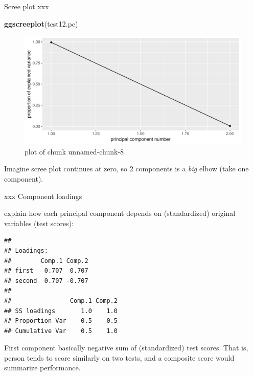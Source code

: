 \documentclass[ignorenonframetext,]{beamer}
\newenvironment{Shaded}{\begin{snugshade}}{\end{snugshade}}
\newcommand{\KeywordTok}[1]{\textcolor[rgb]{0.13,0.29,0.53}{\textbf{#1}}}
\newcommand{\NormalTok}[1]{#1}
\newcommand{\OperatorTok}[1]{\textcolor[rgb]{0.81,0.36,0.00}{\textbf{#1}}}
\begin{document}
\begin{frame}[fragile]{Scree plot xxx}
\protect\hypertarget{scree-plot-xxx}{}

\begin{Shaded}
\begin{Highlighting}[]
\KeywordTok{ggscreeplot}\NormalTok{(test12.pc)}
\end{Highlighting}
\end{Shaded}

\begin{figure}
\centering
\includegraphics{figure/unnamed-chunk-8-1.pdf}
\caption{plot of chunk unnamed-chunk-8}
\end{figure}

Imagine scree plot continues at zero, so 2 components is a \emph{big}
elbow (take one component).

\end{frame}

\begin{frame}[fragile]{xxx Component loadings}
\protect\hypertarget{xxx-component-loadings}{}

explain how each principal component depends on (standardized) original
variables (test scores):

\small

\begin{Shaded}
\end{Shaded}

\begin{verbatim}
## 
## Loadings:
##        Comp.1 Comp.2
## first   0.707  0.707
## second  0.707 -0.707
## 
##                Comp.1 Comp.2
## SS loadings       1.0    1.0
## Proportion Var    0.5    0.5
## Cumulative Var    0.5    1.0
\end{verbatim}

\normalsize

First component basically negative sum of (standardized) test scores.
That is, person tends to score similarly on two tests, and a composite
score would summarize performance.

\end{frame}
\end{document}

